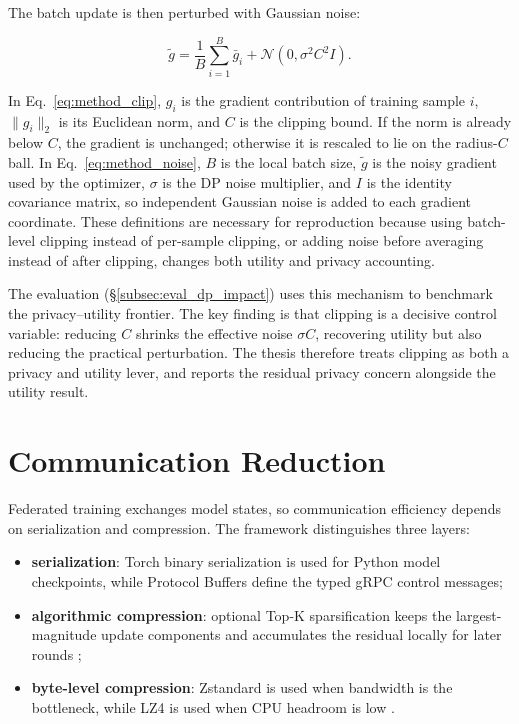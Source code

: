 The batch update is then perturbed with Gaussian noise:

\begin{equation}
    \tilde{g} =
    \frac{1}{B}\sum_{i=1}^{B}\bar{g}_i
    + \mathcal{N}(0,\sigma^2 C^2 I).
    \label{eq:method_noise}
\end{equation}

In Eq.~\ref{eq:method_clip}, $g_i$ is the gradient contribution of training
sample $i$, $\|g_i\|_2$ is its Euclidean norm, and $C$ is the clipping bound.
If the norm is already below $C$, the gradient is unchanged; otherwise it is
rescaled to lie on the radius-$C$ ball. In Eq.~\ref{eq:method_noise}, $B$ is
the local batch size, $\tilde{g}$ is the noisy gradient used by the optimizer,
$\sigma$ is the DP noise multiplier, and $I$ is the identity covariance matrix,
so independent Gaussian noise is added to each gradient coordinate. These
definitions are necessary for reproduction because using batch-level clipping
instead of per-sample clipping, or adding noise before averaging instead of
after clipping, changes both utility and privacy accounting.

The evaluation (\S\ref{subsec:eval_dp_impact}) uses this mechanism to benchmark
the privacy--utility frontier. The key finding is that clipping is a decisive
control variable: reducing $C$ shrinks the effective noise $\sigma C$, recovering
utility but also reducing the practical perturbation. The thesis therefore
treats clipping as both a privacy and utility lever, and reports the residual
privacy concern alongside the utility result.

\section{Communication Reduction}
\label{sec:compression}

Federated training exchanges model states, so communication efficiency depends
on serialization and compression. The framework distinguishes three layers:

\begin{itemize}
    \item \textbf{serialization}: Torch binary serialization is used for Python
    model checkpoints, while Protocol Buffers define the typed gRPC control
    messages;
    \item \textbf{algorithmic compression}: optional Top-K sparsification keeps
    the largest-magnitude update components and accumulates the residual
    locally for later rounds \cite{aji2017sparse, karimireddy2019errorfeedback};
    \item \textbf{byte-level compression}: Zstandard is used when bandwidth is
    the bottleneck, while LZ4 is used when CPU headroom is low
    \cite{collet2018zstandard, lz4_reference}.
\end{itemize}

